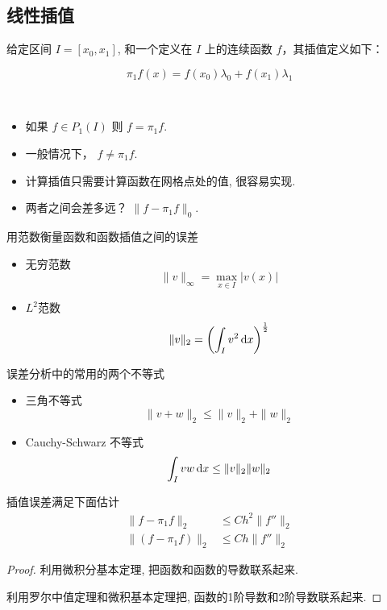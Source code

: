 \documentclass{article}
\begin{document}
\subsection{线性插值}
给定区间 $I = [x_0, x_1]$, 和一个定义在 $I$ 上的连续函数 $f$，其插值定义如下： 

$$
\pi_1f(x) = f(x_0)\lambda_0 + f(x_1)\lambda_1
$$

\begin{framed}
\begin{remark}
~\\
\begin{itemize}
    \item 如果 $f \in P_1(I)$ 则 $ f = \pi_1 f$. 
    \item 一般情况下， $f \not= \pi_1 f$. 
    \item 计算插值只需要计算函数在网格点处的值, 很容易实现.
    \item 两者之间会差多远？ $\| f - \pi_1 f \|_0$.
\end{itemize}
\end{remark}
\end{framed}

\begin{framed}
\begin{remark}
用范数衡量函数和函数插值之间的误差
\begin{itemize}
    \item 无穷范数 $$ \|v\|_\infty = \max_{x\in I} |v(x)|$$
    \item $L^2$范数 $$ \|v\|_2 = \left(\int_I v^2 \,\mathrm d x\right)^{\frac{1}{2}}$$
\end{itemize}
\end{remark}
\end{framed}

\begin{framed}
\begin{remark}
误差分析中的常用的两个不等式
\begin{itemize}
    \item 三角不等式 $$ \|v + w\|_2 \leq \|v\|_2 + \|w\|_2 $$
\item Cauchy-Schwarz 不等式 $$\int_I vw \,\mathrm d x \leq \|v\|_2  \|w\|_2 $$
\end{itemize}
\end{remark}
\end{framed}

\begin{framed}
    \begin{proposition}
        插值误差满足下面估计
        \begin{align*}
            \|f- \pi_1 f\|_2 &\leq C h^2 \|f''\|_2 \\
            \|(f - \pi_1 f)\|_2 &\leq C h \|f''\|_2
        \end{align*}
    \end{proposition}
    \begin{proof}
        利用微积分基本定理, 把函数和函数的导数联系起来. 

        利用罗尔中值定理和微积基本定理把, 函数的1阶导数和2阶导数联系起来.
    \end{proof}
\end{framed}
\end{document}
